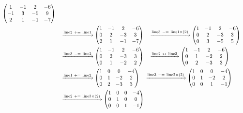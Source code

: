 \documentclass{ltjsarticle}
\begin{document}
\begin{align*}
\begin{pmatrix}
 1 & -1 & 2 & - 6\\
 -1 & 3 & - 5 & 9\\
 2 & 1 & -1 & - 7
\end{pmatrix}\allowdisplaybreaks\\
&\ \ \ \xrightarrow{ \text{line} 2 \ +=\  \text{line} 1 } %
\begin{pmatrix}
 1 & -1 & 2 & - 6\\
 0 & 2 & - 3 & 3\\
 2 & 1 & -1 & - 7
\end{pmatrix}\ \ \ \xrightarrow{ \text{line} 3 \ -=\  \text{line} 1 \times\left( 2 \right)} %
\begin{pmatrix}
 1 & -1 & 2 & - 6\\
 0 & 2 & - 3 & 3\\
 0 & 3 & - 5 & 5
\end{pmatrix}\allowdisplaybreaks\\
 &\ \ \ \xrightarrow{ \text{line} 3 \ -=\  \text{line} 2 } %
\begin{pmatrix}
 1 & -1 & 2 & - 6\\
 0 & 2 & - 3 & 3\\
 0 & 1 & - 2 & 2
\end{pmatrix}\ \ \ \xrightarrow{ \text{line} 2 \ \leftrightarrow\  \text{line} 3 } %
\begin{pmatrix}
 1 & -1 & 2 & - 6\\
 0 & 1 & - 2 & 2\\
 0 & 2 & - 3 & 3
\end{pmatrix}\allowdisplaybreaks\\
 &\ \ \ \xrightarrow{ \text{line} 1 \ +=\  \text{line} 2 } %
\begin{pmatrix}
 1 & 0 & 0 & - 4\\
 0 & 1 & - 2 & 2\\
 0 & 2 & - 3 & 3
\end{pmatrix}\ \ \ \xrightarrow{ \text{line} 3 \ -=\  \text{line} 2 \times\left( 2 \right)} %
\begin{pmatrix}
 1 & 0 & 0 & - 4\\
 0 & 1 & - 2 & 2\\
 0 & 0 & 1 & -1
\end{pmatrix}\allowdisplaybreaks\\
 &\ \ \ \xrightarrow{ \text{line} 2 \ +=\  \text{line} 3 \times\left( 2 \right)} %
\begin{pmatrix}
 1 & 0 & 0 & - 4\\
 0 & 1 & 0 & 0\\
 0 & 0 & 1 & -1
\end{pmatrix}
\end{align*}
\end{document}
